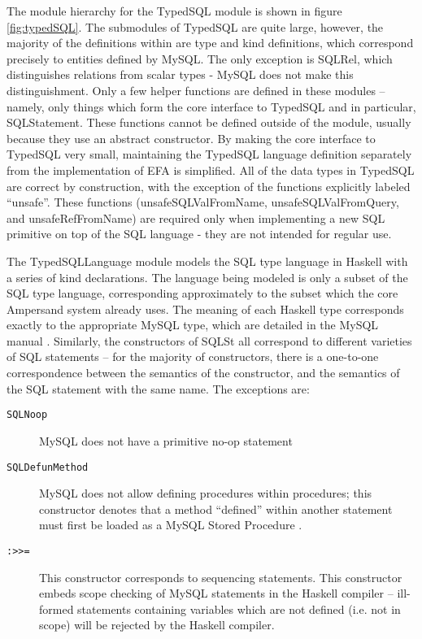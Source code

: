 The module hierarchy for the TypedSQL module is shown in
figure \ref{fig:typedSQL}. The submodules of TypedSQL are quite large, 
however, the majority of the definitions within are type and kind definitions, 
which correspond precisely to entities defined by MySQL. The only exception is 
SQLRel, which distinguishes relations from scalar types - MySQL does not make 
this distinguishment. 
Only a few
helper functions are defined in these modules -- namely, only things which 
form
the core interface to TypedSQL and in particular, SQLStatement. These 
functions
cannot be defined outside of the module, usually because they use an 
abstract
constructor. By making the core interface to TypedSQL very small, 
maintaining 
the TypedSQL language definition separately from the implementation of 
EFA is simplified. All of the data types in TypedSQL are correct by 
construction, with the exception of the functions explicitly labeled 
``unsafe''. These functions (unsafeSQLValFromName, unsafeSQLValFromQuery, and 
unsafeRefFromName)
are required only when implementing a new SQL primitive on top of the SQL
language - they are not intended for regular use. 

The TypedSQLLanguage module models the SQL type language in Haskell with a
series of kind declarations. The language being modeled is only a subset of 
the
SQL type language, corresponding approximately to the subset which the core
Ampersand system already uses. The meaning of each Haskell type corresponds
exactly to the appropriate MySQL type, which are detailed in the MySQL
manual \citep{mySQLman}. Similarly, the constructors of SQLSt all correspond
to different varieties of SQL statements -- for the majority of 
constructors,
there is a one-to-one correspondence between the semantics of the 
constructor,
and the semantics of the SQL statement with the same name. The exceptions 
are:     
\begin{description}
\item[\texttt{SQLNoop}] MySQL does not have a primitive no-op statement
\item[\texttt{SQLDefunMethod}]  MySQL does not allow defining 
procedures within procedures; 
this constructor denotes that a method ``defined'' within another 
statement must 
first be loaded as a MySQL Stored Procedure \citep{mySQLman}.
\item[\texttt{:>>=}] This constructor corresponds to sequencing 
statements. This constructor
embeds scope checking of MySQL statements in the Haskell compiler -- 
ill-formed statements
containing variables which are not defined (i.e. not in scope) will be 
rejected by the Haskell
compiler. 
\end{description}

